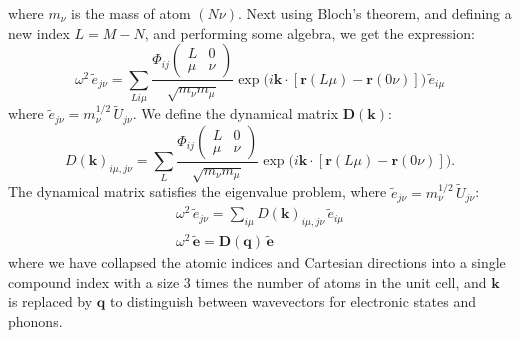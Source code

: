 \documentclass[11pt]{article}
\numberwithin{equation}{section}
\newcommand{\idx}[2]{\begin{pmatrix}#1\\#2\end{pmatrix}}
\begin{document}
where $m_\nu$ is the mass of atom $(N\nu)$. Next using Bloch's theorem, and
defining a new index $L = M - N$, and performing some algebra, we get the
expression:
\begin{equation}
\omega^2\,\tilde{e}_{j\nu}
= \sum_{Li\mu} \frac{\Phi_{ij}\idx{L & 0}{\mu & \nu}}{\sqrt{m_\nu m_\mu}}
\exp\!\big(i\mathbf{k}\cdot[\mathbf{r}(L\mu) - \mathbf{r}(0\nu)]\big)\,\tilde{e}_{i\mu}
\end{equation}
where $\tilde{e}_{j\nu} = m_\nu^{1/2}\,\tilde{U}_{j\nu}$. We define the
dynamical matrix $\mathbf{D}(\mathbf{k})$:
\begin{equation}
D(\mathbf{k})_{i\mu,j\nu}
= \sum_{L} \frac{\Phi_{ij}\idx{L & 0}{\mu & \nu}}{\sqrt{m_\nu m_\mu}}
\exp\!\big(i\mathbf{k}\cdot[\mathbf{r}(L\mu) - \mathbf{r}(0\nu)]\big).
\end{equation}
The dynamical matrix satisfies the eigenvalue problem, where
$\tilde{e}_{j\nu} = m_\nu^{1/2}\,\tilde{U}_{j\nu}$:
\begin{gather}
\omega^2\,\tilde{e}_{j\nu} = \sum_{i\mu} D(\mathbf{k})_{i\mu,j\nu}\,\tilde{e}_{i\mu} \\
\omega^2\,\tilde{\mathbf{e}} = \mathbf{D}(\mathbf{q})\,\tilde{\mathbf{e}}
\end{gather}
where we have collapsed the atomic indices and Cartesian directions into a
single compound index with a size 3 times the number of atoms in the unit
cell, and $\mathbf{k}$ is replaced by $\mathbf{q}$ to distinguish between
wavevectors for electronic states and phonons.
\end{document}

